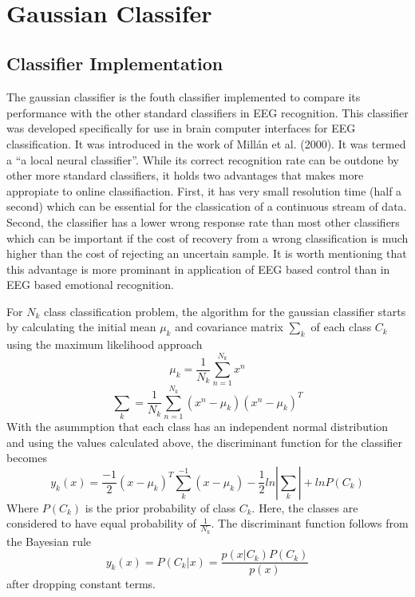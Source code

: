 \documentclass[12pt, a4paper, fleqn]{memoir}%
\begin{document}
\\

\section{Gaussian Classifer}
\label{sec:GaussianClassifier}

\subsection{Classifier Implementation}
The gaussian classifier is the fouth classifier implemented to compare its performance with the other standard classifiers in EEG recognition. This classifier was developed specifically for use in brain computer interfaces for EEG classification. It was introduced in the work of Mill\'{a}n et al. (2000)\cite{millan2000local}. It was termed a ``a local neural classifier''. While its correct recognition rate can be outdone by other more standard classifiers, it holds two advantages that makes more appropiate to online classifiaction. First, it has very small resolution time (half a second) which can be essential for the classication of a continuous stream of data. Second, the classifier has a lower wrong response rate than most other classifiers which can be important if the cost of recovery from a wrong classification is much higher than the cost of rejecting an uncertain sample. It is worth mentioning that this advantage is more prominant in application of EEG based control than in EEG based emotional recognition.

For $N_k$ class classification problem, the algorithm for the gaussian classifier starts by calculating the initial mean $\mu_k$ and covariance matrix $\sum_k$ of each class $C_k$ using the maximum likelihood approach
\begin{equation} \label{eq:mean}
	\mu_k = \frac{1}{N_k}\sum_{n=1}^{N_k}x^n
\end{equation}
\begin{equation} \label{eq:cov}
	\sum_k = \frac{1}{N_k}\sum_{n=1}^{N_k}(x^n - \mu_k)(x^n - \mu_k)^T
\end{equation}
With the asummption that each class has an independent normal distribution and using the values calculated above, the discriminant function for the classifier becomes
\begin{equation} \label{eq:yk}
	y_k(x) = \frac{-1}{2}(x - \mu_k)^T\sum_k^{-1}(x-\mu_k)-\frac{1}{2}ln|\sum_k|+lnP(C_k)
\end{equation}
Where $P(C_k)$ is the prior probability of class $C_k$. Here, the classes are considered to have equal probability of $\frac{1}{N_k}$. The discriminant function follows from the Bayesian rule
$$y_k(x) = P(C_k|x) = \frac{p(x|C_k)P(C_k)}{p(x)}$$
after dropping constant terms.
\end{document}

